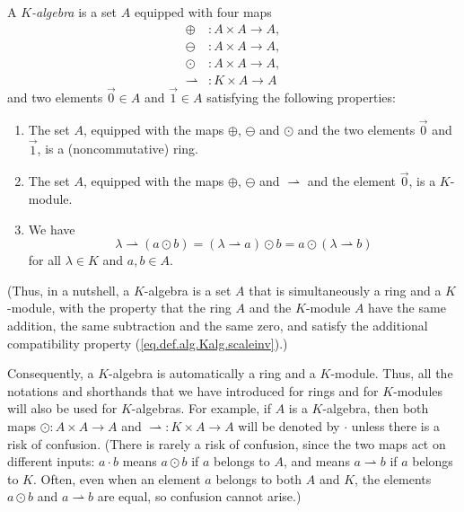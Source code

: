 \begin{definition}
\label{def.alg.Kalg}A $K$\emph{-algebra} is a set $A$ equipped with four maps%
\begin{align*}
\oplus &  :A\times A\rightarrow A,\\
\ominus &  :A\times A\rightarrow A,\\
\odot &  :A\times A\rightarrow A,\\
\rightharpoonup &  :K\times A\rightarrow A
\end{align*}
and two elements $\overrightarrow{0}\in A$ and $\overrightarrow{1}\in A$
satisfying the following properties:

\begin{enumerate}
\item The set $A$, equipped with the maps $\oplus$, $\ominus$ and $\odot$ and
the two elements $\overrightarrow{0}$ and $\overrightarrow{1}$, is a
(noncommutative) ring.

\item The set $A$, equipped with the maps $\oplus$, $\ominus$ and
$\rightharpoonup$ and the element $\overrightarrow{0}$, is a $K$-module.

\item We have%
\begin{equation}
\lambda\rightharpoonup\left(  a\odot b\right)  =\left(  \lambda\rightharpoonup
a\right)  \odot b=a\odot\left(  \lambda\rightharpoonup b\right)
\label{eq.def.alg.Kalg.scaleinv}%
\end{equation}
for all $\lambda\in K$ and $a,b\in A$.
\end{enumerate}

(Thus, in a nutshell, a $K$-algebra is a set $A$ that is simultaneously a ring
and a $K$-module, with the property that the ring $A$ and the $K$-module $A$
have the same addition, the same subtraction and the same zero, and satisfy
the additional compatibility property (\ref{eq.def.alg.Kalg.scaleinv}).)

Consequently, a $K$-algebra is automatically a ring and a $K$-module. Thus,
all the notations and shorthands that we have introduced for rings and for
$K$-modules will also be used for $K$-algebras. For example, if $A$ is a
$K$-algebra, then both maps $\odot:A\times A\rightarrow A$ and $\left.
\rightharpoonup\right.  :K\times A\rightarrow A$ will be denoted by $\cdot$
unless there is a risk of confusion. (There is rarely a risk of confusion,
since the two maps act on different inputs: $a\cdot b$ means $a\odot b$ if $a$
belongs to $A$, and means $a\rightharpoonup b$ if $a$ belongs to $K$. Often,
even when an element $a$ belongs to both $A$ and $K$, the elements $a\odot b$
and $a\rightharpoonup b$ are equal, so confusion cannot arise.)
\end{definition}


